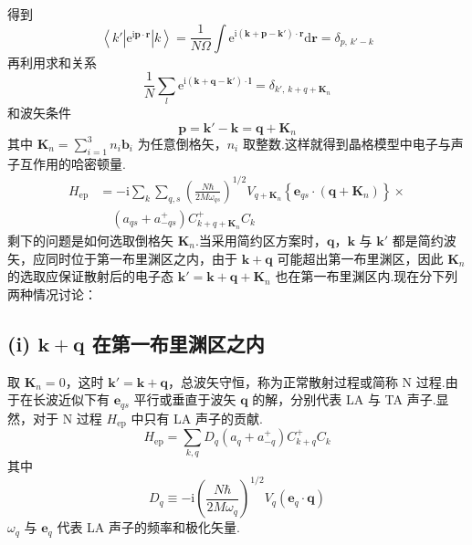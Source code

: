 得到
\begin{equation}
  \left\langle k'\left|\mathrm{e}^{\mathrm{i}\boldsymbol{p}\cdot\boldsymbol{r}}\right|k\right\rangle
  =\frac{1}{N\Omega}\int\mathrm{e}^{\mathrm{i}\left(\boldsymbol{k}+\boldsymbol{p}-\boldsymbol{k}'\right)\cdot\boldsymbol{r}}\mathrm{d}\boldsymbol{r}
  =\delta_{p,\,k'-k}
\end{equation}
再利用求和关系
\begin{equation}
  \frac{1}{N}\sum_{l}\mathrm{e}^{\mathrm{i}\left(\boldsymbol{k}+\boldsymbol{q}-\boldsymbol{k}'\right)\cdot\boldsymbol{l}}
  =\delta_{k',\,k+q+\boldsymbol{K}_n}
\end{equation}
和波矢条件
\begin{equation}
  \boldsymbol{p}=\boldsymbol{k}'-\boldsymbol{k}=\boldsymbol{q}+\boldsymbol{K}_n
\end{equation}
其中 $\boldsymbol{K}_n=\sum_{i=1}^{3}n_i\boldsymbol{b}_i$ 为任意倒格矢，$n_i$ 取整数.这样就得到晶格模型中电子与声子互作用的哈密顿量.
\begin{equation}
\begin{aligned}
  H_{\mathrm{ep}}&=-\mathrm{i}\sum_{k}\sum_{q,s}\left(\frac{N\hbar}{2M\omega_{qs}}\right)^{1/2}
  V_{q+\boldsymbol{K}_n}\left\{\boldsymbol{e}_{qs}\cdot\left(\boldsymbol{q}+\boldsymbol{K}_n\right)\right\}\times\\
  &\quad\left(a_{qs}+a_{-qs}^{+}\right)C_{k+q+\boldsymbol{K}_n}^{+}C_k
\end{aligned}
\end{equation}
剩下的问题是如何选取倒格矢 $\boldsymbol{K}_n$.当采用简约区方案时，$\boldsymbol{q}$，$\boldsymbol{k}$ 与 $\boldsymbol{k}'$ 都是简约波矢，应同时位于第一布里渊区之内，由于 $\boldsymbol{k}+\boldsymbol{q}$ 可能超出第一布里渊区，因此 $\boldsymbol{K}_n$ 的选取应保证散射后的电子态 $\boldsymbol{k}'=\boldsymbol{k}+\boldsymbol{q}+\boldsymbol{K}_n$ 也在第一布里渊区内.现在分下列两种情况讨论：

\subsection*{(i) $\boldsymbol{k}+\boldsymbol{q}$ 在第一布里渊区之内}

取 $\boldsymbol{K}_n=0$，这时 $\boldsymbol{k}'=\boldsymbol{k}+\boldsymbol{q}$，总波矢守恒，称为正常散射过程或简称 N 过程.由于在长波近似下有 $\boldsymbol{e}_{qs}$ 平行或垂直于波矢 $\boldsymbol{q}$ 的解，分别代表 LA 与 TA 声子.显然，对于 N 过程 $H_{\mathrm{ep}}$ 中只有 LA 声子的贡献.
\begin{equation}
  H_{\mathrm{ep}}=\sum_{k,q}D_q\left(a_q+a_{-q}^{+}\right)C_{k+q}^{+}C_k
\end{equation}
其中
\begin{equation}
  D_q\equiv-\mathrm{i}\left(\frac{N\hbar}{2M\omega_q}\right)^{1/2}V_q
  \left(\boldsymbol{e}_q\cdot\boldsymbol{q}\right)
\end{equation}
$\omega_q$ 与 $\boldsymbol{e}_q$ 代表 LA 声子的频率和极化矢量.


